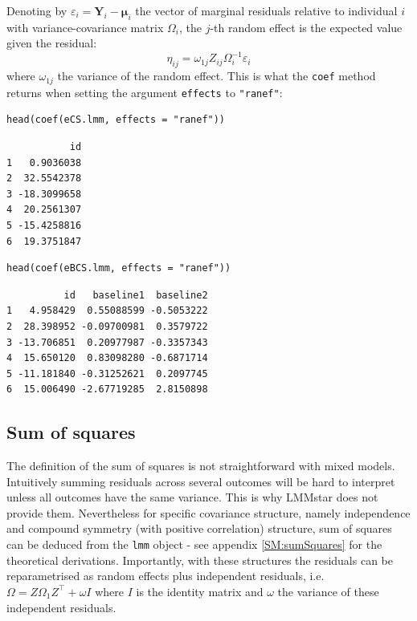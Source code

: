 \documentclass[12pt]{article}
\newcommand\Warning[1][3ex]{%
\renewcommand\stacktype{L}%
\scaleto{\stackon[1.3pt]{\color{red}$\triangle$}{\tiny\bfseries !}}{#1}%
\xspace
}
\newcommand\trans[1]{{#1}^\intercal}%
\newcommand{\VY}{\boldsymbol{Y}}
\begin{document}
Denoting by \(\varepsilon_i=\VY_i-\boldsymbol{\mu}_i\) the vector of
marginal residuals relative to individual \(i\) with
variance-covariance matrix \(\Omega_i\), the \(j\)-th random effect is
the expected value given the residual:
\[ \eta_{ij} = \omega_{1j} Z_{ij} \Omega_i^{-1}\varepsilon_i \]
where \(\omega_{1j}\) the variance of the random effect. This is what
the \texttt{coef} method returns when setting the argument \texttt{effects} to
\texttt{"ranef"}:

\bigskip

\begin{minipage}{0.45\linewidth}
\lstset{language=r,label= ,caption= ,captionpos=b,numbers=none}
\begin{lstlisting}
head(coef(eCS.lmm, effects = "ranef"))
\end{lstlisting}

\begin{verbatim}
           id
1   0.9036038
2  32.5542378
3 -18.3099658
4  20.2561307
5 -15.4258816
6  19.3751847
\end{verbatim}

\end{minipage}
\begin{minipage}{0.5\linewidth}
\lstset{language=r,label= ,caption= ,captionpos=b,numbers=none}
\begin{lstlisting}
head(coef(eBCS.lmm, effects = "ranef"))
\end{lstlisting}

\begin{verbatim}
          id   baseline1  baseline2
1   4.958429  0.55088599 -0.5053222
2  28.398952 -0.09700981  0.3579722
3 -13.706851  0.20977987 -0.3357343
4  15.650120  0.83098280 -0.6871714
5 -11.181840 -0.31252621  0.2097745
6  15.006490 -2.67719285  2.8150898
\end{verbatim}


\end{minipage}

\clearpage

\subsection{Sum of squares}
\label{sec:orgc57db21}

\Warning The definition of the sum of squares is not straightforward with mixed
models. Intuitively summing residuals across several outcomes will be
hard to interpret unless all outcomes have the same variance. This is
why LMMstar does not provide them. Nevertheless for specific
covariance structure, namely independence and compound symmetry (with
positive correlation) structure, sum of squares can be deduced from
the \texttt{lmm} object - see appendix \ref{SM:sumSquares} for the theoretical
derivations. Importantly, with these structures the residuals can be
reparametrised as random effects plus independent residuals,
i.e. \(\Omega = Z \Omega_1 \trans{Z} + \omega I\) where \(I\) is the
identity matrix and \(\omega\) the variance of these independent
residuals.
\end{document}
